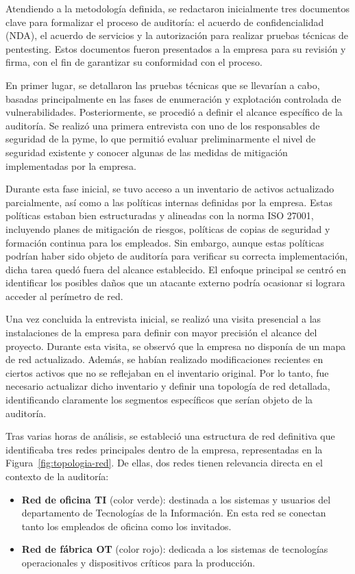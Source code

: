 \documentclass[a4paper, 11pt]{article}
\begin{document}
Atendiendo a la metodología definida, se redactaron inicialmente tres documentos clave para formalizar el proceso de auditoría: el acuerdo de confidencialidad (NDA), el acuerdo de servicios y la autorización para realizar pruebas técnicas de pentesting. Estos documentos fueron presentados a la empresa para su revisión y firma, con el fin de garantizar su conformidad con el proceso.


En primer lugar, se detallaron las pruebas técnicas que se llevarían a cabo, basadas principalmente en las fases de enumeración y explotación controlada de vulnerabilidades. Posteriormente, se procedió a definir el alcance específico de la auditoría. Se realizó una primera entrevista con uno de los responsables de seguridad de la pyme, lo que permitió evaluar preliminarmente el nivel de seguridad existente y conocer algunas de las medidas de mitigación implementadas por la empresa.


Durante esta fase inicial, se tuvo acceso a un inventario de activos actualizado parcialmente, así como a las políticas internas definidas por la empresa. Estas políticas estaban bien estructuradas y alineadas con la norma ISO 27001, incluyendo planes de mitigación de riesgos, políticas de copias de seguridad y formación continua para los empleados. Sin embargo, aunque estas políticas podrían haber sido objeto de auditoría para verificar su correcta implementación, dicha tarea quedó fuera del alcance establecido. El enfoque principal se centró en identificar los posibles daños que un atacante externo podría ocasionar si lograra acceder al perímetro de red.


Una vez concluida la entrevista inicial, se realizó una visita presencial a las instalaciones de la empresa para definir con mayor precisión el alcance del proyecto. 
Durante esta visita, se observó que la empresa no disponía de un mapa de red actualizado. Además, se habían realizado modificaciones recientes en 
ciertos activos que no se reflejaban en el inventario original. 
Por lo tanto, fue necesario actualizar dicho inventario y definir una topología de red detallada, identificando claramente los segmentos específicos que 
serían objeto de la auditoría.


Tras varias horas de análisis, se estableció una estructura de red definitiva que identificaba tres redes principales dentro de la empresa, representadas en la Figura~\ref{fig:topologia-red}. De ellas, dos redes tienen relevancia directa en el contexto de la auditoría:

\begin{itemize}
    \item \textbf{Red de oficina TI} (color verde): destinada a los sistemas y usuarios del departamento de Tecnologías de la Información. En esta red se conectan tanto los empleados de oficina como los invitados.
    \item \textbf{Red de fábrica OT} (color rojo): dedicada a los sistemas de tecnologías operacionales y dispositivos críticos para la producción.
\end{itemize}
\end{document}
